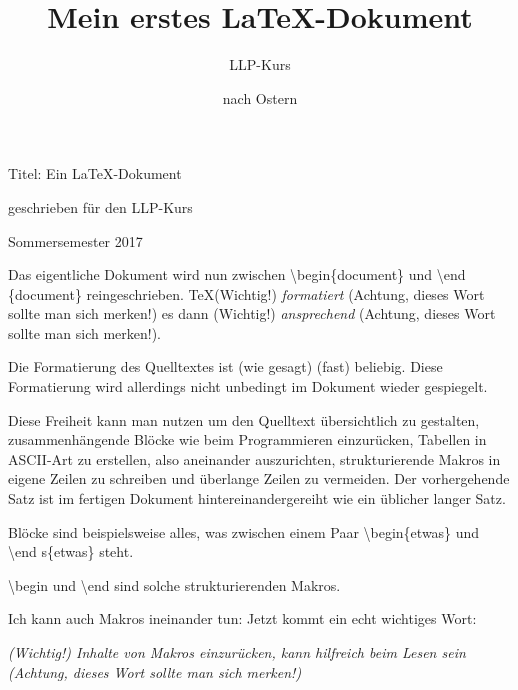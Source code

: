 \documentclass{scrartcl}
\title{Mein erstes \LaTeX-Dokument}
\author{LLP-Kurs}
\date{nach Ostern}
\newcommand{\wichtig}[1]{(Wichtig!) \emph{#1} (Achtung, dieses Wort sollte man sich merken!)}
\newcommand{\tb}{\textbackslash}
\renewcommand{\maketitle}{
  Titel: Ein \LaTeX-Dokument

  geschrieben für den LLP-Kurs

  Sommersemester 2017

}
\begin{document}
\maketitle
  Das eigentliche Dokument         wird      nun
  zwischen
  \tb begin\{document\} und
  \tb end  \{document\}
  reingeschrieben.
  \TeX \wichtig {formatiert}        es dann \wichtig {ansprechend}.

  Die Formatierung des Quelltextes ist (wie gesagt) (fast) beliebig.  Diese
  Formatierung wird allerdings nicht unbedingt im Dokument wieder gespiegelt.

  Diese Freiheit kann man nutzen um
    den Quelltext übersichtlich zu gestalten,
    zusammenhängende Blöcke wie beim Programmieren           einzurücken,
    Tabellen in      ASCII-Art zu erstellen, also aneinander auszurichten,
    strukturierende Makros in eigene Zeilen zu schreiben
   und
    überlange Zeilen zu vermeiden.
  Der vorhergehende Satz ist im fertigen Dokument hintereinandergereiht wie ein üblicher langer Satz.

  Blöcke sind beispielsweise alles, was zwischen einem Paar
  \tb begin\{etwas\}
    und
  \tb end  s\{etwas\}
  steht.

  \tb begin und \tb end sind solche strukturierenden Makros.

  Ich kann auch Makros ineinander tun: Jetzt kommt ein echt
  wichtiges Wort:\par
  \emph{
    \wichtig {Inhalte von Makros einzurücken, kann hilfreich beim Lesen sein}
  }
\end{document}
